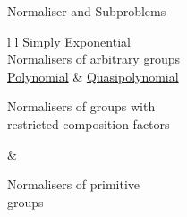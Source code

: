 
\begin{frame}{Normaliser and Subproblems}
    \begin{tabular}{l l}
        {\underline{Simply Exponential} \hspace{4em} $~$}
        \\[0.5em]
        {Normalisers of arbitrary groups}
        \\[1.5em]

        \underline{Polynomial}
        &
        \underline{Quasipolynomial}
        \\[0.5em]
        \parbox{0.5\linewidth}
        {Normalisers of groups with \\ restricted composition factors}
        &
        \parbox{0.5\linewidth}
        {Normalisers of primitive \\ groups}
        \\
    \end{tabular}
\end{frame}
